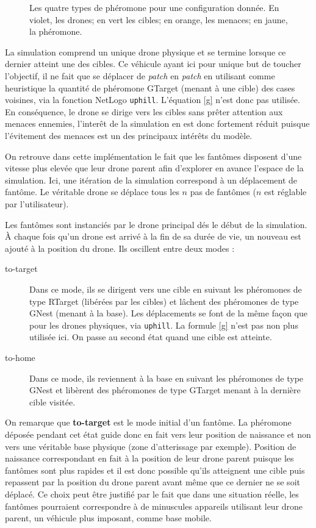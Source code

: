 \documentclass[12pt]{article}
\begin{document}
\begin{figure}[p]
  \caption{Les quatre types de phéromone pour une configuration
    donnée. En violet, les drones; en vert les cibles; en orange, les
    menaces; en jaune, la phéromone.}
  \label{pheromones}
\end{figure}

La simulation comprend un unique drone physique et se termine lorsque
ce dernier atteint une des cibles. Ce véhicule ayant ici pour unique
but de toucher l'objectif, il ne fait que se déplacer de
\textit{patch} en \textit{patch} en utilisant comme heuristique la
quantité de phéromone GTarget (menant à une cible) des cases voisines,
via la fonction NetLogo \texttt{uphill}. L'équation \ref{g} n'est donc
pas utilisée. En conséquence, le drone se dirige vers les cibles sans
prêter attention aux menaces ennemies, l'interêt de la simulation en
est donc fortement réduit puisque l'évitement des menaces est un des
principaux intérêts du modèle.

On retrouve dans cette implémentation le fait que les fantômes
disposent d'une vitesse plus elevée que leur drone parent afin
d'explorer en avance l'espace de la simulation. Ici, une itération de
la simulation correspond à un déplacement de fantôme. Le véritable
drone se déplace tous les $n$ pas de fantômes ($n$ est réglable par
l'utilisateur).

Les fantômes sont instanciés par le drone principal dés le début de la
simulation. \`A chaque fois qu'un drone est arrivé à la fin de sa
durée de vie, un nouveau est ajouté à la position du drone. Ils
oscillent entre deux modes :

\begin{description}

  \item[to-target]{Dans ce mode, ils se dirigent vers une cible en
    suivant les phéromones de type RTarget (libérées par les cibles)
    et lâchent des phéromones de type GNest (menant à la base). Les
    déplacements se font de la même façon que pour les drones
    physiques, via \texttt{uphill}. La formule \ref{g} n'est pas non
    plus utilisée ici. On passe au second état quand une cible est
    atteinte.}

  \item[to-home]{Dans ce mode, ils reviennent à la base en suivant les
    phéromones de type GNest et libèrent des phéromones de type
    GTarget menant à la dernière cible visitée.}

\end{description}

On remarque que \textbf{to-target} est le mode initial d'un
fantôme. La phéromone déposée pendant cet état guide donc en fait vers
leur position de naissance et non vers une véritable base physique
(zone d'atterissage par exemple). Position de naissance correspondant
en fait à la position de leur drone parent puisque les fantômes sont
plus rapides et il est donc possible qu'ils atteignent une cible puis
repassent par la position du drone parent avant même que ce dernier ne
se soit déplacé. Ce choix peut être justifié par le fait que dans une
situation réelle, les fantômes pourraient correspondre à de minuscules
appareils utilisant leur drone parent, un véhicule plus imposant,
comme base mobile.
\end{document}
